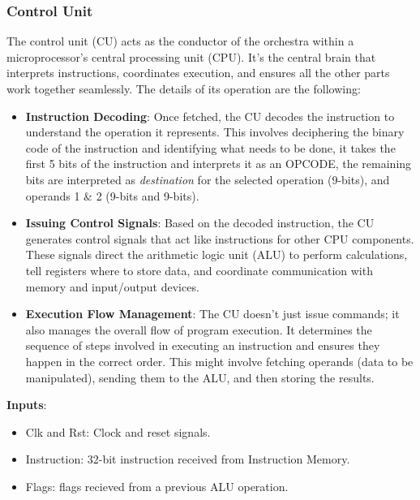\documentclass[9pt,a4paper,twoside]{tau}
\begin{document}
\subsubsection{Control Unit}
    The control unit (CU) acts as the conductor of the orchestra within a microprocessor's central processing unit (CPU). It's the central brain that interprets instructions, coordinates execution, and ensures all the other parts work together seamlessly. The details of its operation are the following:

    \begin{itemize}
        \item \textbf{Instruction Decoding}: Once fetched, the CU decodes the instruction to understand the operation it represents. This involves deciphering the binary code of the instruction and identifying what needs to be done, it takes the first 5 bits of the instruction and interprets it as an OPCODE, the remaining bits are interpreted as \textit{destination} for the selected operation (9-bits), and operands 1 \& 2 (9-bits and 9-bits).
        
        \item \textbf{Issuing Control Signals}: Based on the decoded instruction, the CU generates control signals that act like instructions for other CPU components. These signals direct the arithmetic logic unit (ALU) to perform calculations, tell registers where to store data, and coordinate communication with memory and input/output devices.
        
        \item \textbf{Execution Flow Management}: The CU doesn't just issue commands; it also manages the overall flow of program execution. It determines the sequence of steps involved in executing an instruction and ensures they happen in the correct order. This might involve fetching operands (data to be manipulated), sending them to the ALU, and then storing the results. \\ 

    \end{itemize}

    \textbf{Inputs}:
    \begin{itemize}
        \item Clk and Rst: Clock and reset signals.
        \item Instruction: 32-bit instruction received from Instruction  Memory.
        \item Flags: flags recieved from a previous ALU operation.
    \end{itemize}
    
\end{document}
